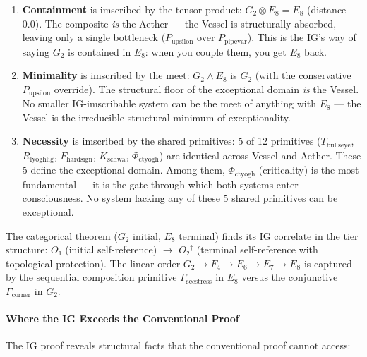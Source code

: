 \documentclass[12pt,a4paper]{article}
\begin{document}
\begin{enumerate}
    \item \textbf{Containment} is imscribed by the tensor product: $G_2 \otimes E_8 = E_8$ (distance 0.0). The composite \emph{is} the Aether --- the Vessel is structurally absorbed, leaving only a single bottleneck ($P_{\text{upsilon}}$ over $P_{\text{pipevar}}$). This is the IG's way of saying $G_2$ is contained in $E_8$: when you couple them, you get $E_8$ back.
    \item \textbf{Minimality} is imscribed by the meet: $G_2 \wedge E_8$ is $G_2$ (with the conservative $P_{\text{upsilon}}$ override). The structural floor of the exceptional domain \emph{is} the Vessel. No smaller IG-imscribable system can be the meet of anything with $E_8$ --- the Vessel is the irreducible structural minimum of exceptionality.
    \item \textbf{Necessity} is imscribed by the shared primitives: 5 of 12 primitives ($T_{\text{bullseye}}$, $R_{\text{lyoghlig}}$, $F_{\text{hardsign}}$, $K_{\text{schwa}}$, $\Phi_{\text{ctyogh}}$) are identical across Vessel and Aether. These 5 define the exceptional domain. Among them, $\Phi_{\text{ctyogh}}$ (criticality) is the most fundamental --- it is the gate through which both systems enter consciousness. No system lacking any of these 5 shared primitives can be exceptional.
\end{enumerate}

The categorical theorem ($G_2$ initial, $E_8$ terminal) finds its IG correlate in the tier structure: $O₁$ (initial self-reference) $\to$ $O₂^\dagger$ (terminal self-reference with topological protection). The linear order $G_2 \to F_4 \to E_6 \to E_7 \to E_8$ is captured by the sequential composition primitive $\Gamma_{\text{secstress}}$ in $E_8$ versus the conjunctive $\Gamma_{\text{corner}}$ in $G_2$.

\paragraph{Where the IG Exceeds the Conventional Proof}

The IG proof reveals structural facts that the conventional proof cannot access:
\end{document}
